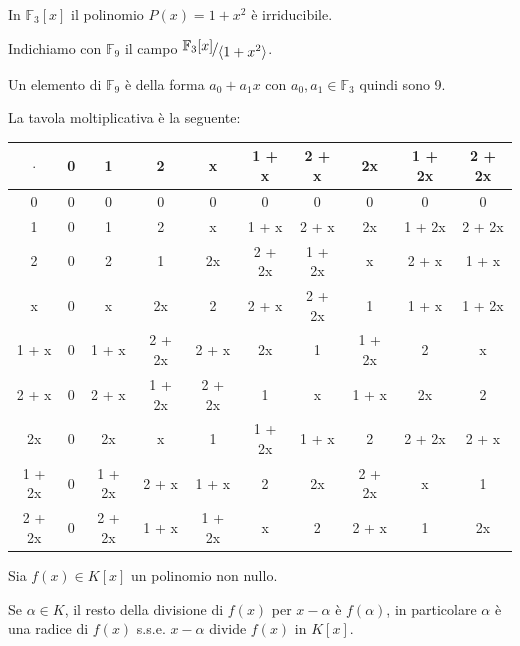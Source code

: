 \documentclass[../main.tex]{subfiles}
\begin{document}
\begin{example}
    In $\mathbb{F}_3[x]$ il polinomio $P(x) = 1 + x^2$ è irriducibile.

    Indichiamo con $\mathbb{F}_9$ il campo $\nicefrac{\mathbb{F}_3[x]}{\langle1 + x^2\rangle}$.

    Un elemento di $\mathbb{F}_9$ è della forma $a_0 + a_1x$ con $a_0,a_1 \in \mathbb{F}_3$ quindi sono 9.

    La tavola moltiplicativa è la seguente:
    \begin{center}
        \begin{tabular}{c|c|c|c|c|c|c|c|c|c}
            $\cdot$ & 0 & 1      & 2      & x      & 1 + x  & 2 + x  & 2x     & 1 + 2x & 2 + 2x \\
            \hline
            0       & 0 & 0      & 0      & 0      & 0      & 0      & 0      & 0      & 0      \\
            \hline
            1       & 0 & 1      & 2      & x      & 1 + x  & 2 + x  & 2x     & 1 + 2x & 2 + 2x \\
            \hline
            2       & 0 & 2      & 1      & 2x     & 2 + 2x & 1 + 2x & x      & 2 + x  & 1 + x  \\
            \hline
            x       & 0 & x      & 2x     & 2      & 2 + x  & 2 + 2x & 1      & 1 + x  & 1 + 2x \\
            \hline
            1 + x   & 0 & 1 + x  & 2 + 2x & 2 + x  & 2x     & 1      & 1 + 2x & 2      & x      \\
            \hline
            2 + x   & 0 & 2 + x  & 1 + 2x & 2 + 2x & 1      & x      & 1 + x  & 2x     & 2      \\
            \hline
            2x      & 0 & 2x     & x      & 1      & 1 + 2x & 1 + x  & 2      & 2 + 2x & 2 + x  \\
            \hline
            1 + 2x  & 0 & 1 + 2x & 2 + x  & 1 + x  & 2      & 2x     & 2 + 2x & x      & 1      \\
            \hline
            2 + 2x  & 0 & 2 + 2x & 1 + x  & 1 + 2x & x      & 2      & 2 + x  & 1      & 2x     \\
        \end{tabular}
    \end{center}
\end{example}

\begin{theorem}[di Ruffini]
    Sia $f(x) \in K[x]$ un polinomio non nullo.

    Se $\alpha \in K$, il resto della divisione di $f(x)$ per $x - \alpha$ è $f(\alpha)$, in particolare $\alpha$ è una radice di $f(x)$ s.s.e. $x - \alpha$ divide $f(x)$ in $K[x]$.
\end{theorem}
\end{document}
